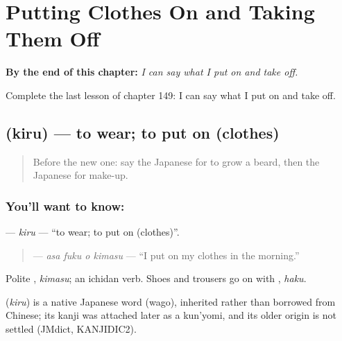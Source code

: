 
\chapter{Putting Clothes On and Taking Them Off}
\label{ch:ja-putting-clothes-on-and-taking-them-off}

\begin{chapteropening}
\textbf{By the end of this chapter:} \emph{I can say what I put on and take off.}

Complete the last lesson of chapter 149: I can say what I put on and take off.
\end{chapteropening}

\section[\texorpdfstring{\ja{きる} (kiru)}{きる (kiru)}]{ (kiru) — to wear; to put on (clothes)}

\label{lesson:JA-C149-kiru}



\begin{quote}
Before the new one: say the Japanese for to grow a beard, then the Japanese for make-up.
\end{quote}

\subsection*{You'll want to know: }
\textbf{} — \emph{kiru} — \textquotedblleft{}to wear; to put on (clothes)\textquotedblright{}.

\begin{quote}
\textbf{  } — \emph{asa fuku o kimasu} — \textquotedblleft{}I put on my clothes in the morning.\textquotedblright{}
\end{quote}

Polite \textbf{}, \emph{kimasu}; an ichidan verb. Shoes and trousers go on with \textbf{}, \emph{haku}.

\begin{cousinweb}
\textbf{} (\emph{kiru}) is a native Japanese word (wago), inherited rather than borrowed from Chinese; its kanji was attached later as a kun'yomi, and its older origin is not settled (JMdict, KANJIDIC2).
\end{cousinweb}

